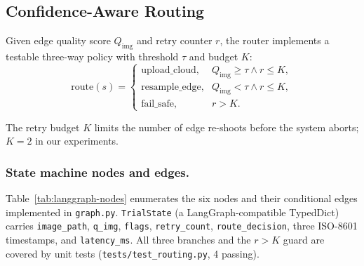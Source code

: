 \subsection{Confidence-Aware Routing}
\label{sec:routing}

Given edge quality score $Q_{\mathrm{img}}$ and retry counter $r$, the router implements a testable three-way policy with threshold $\tau$ and budget $K$:
\begin{equation}
\text{route}(s)=
\begin{cases}
\text{upload\_cloud}, & Q_{\mathrm{img}}\geq\tau \land r\leq K,\\
\text{resample\_edge}, & Q_{\mathrm{img}}<\tau \land r\leq K,\\
\text{fail\_safe}, & r>K.
\end{cases}
\label{eq:routing}
\end{equation}

The retry budget $K$ limits the number of edge re-shoots before the system aborts; $K=2$ in our experiments.

\subsubsection{State machine nodes and edges.}
Table~\ref{tab:langgraph-nodes} enumerates the six nodes and their conditional edges implemented in \texttt{graph.py}. \texttt{TrialState} (a LangGraph-compatible TypedDict) carries \texttt{image\_path}, \texttt{q\_img}, \texttt{flags}, \texttt{retry\_count}, \texttt{route\_decision}, three ISO-8601 timestamps, and \texttt{latency\_ms}. All three branches and the $r>K$ guard are covered by unit tests (\texttt{tests/test\_routing.py}, 4 passing).

\begin{table}[t]
\centering
\caption{LangGraph nodes and conditional edges for closed-loop acquisition.}
\label{tab:langgraph-nodes}
\small
{}
\end{table}

